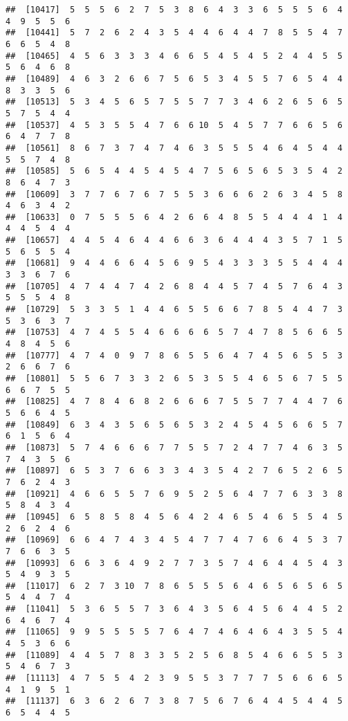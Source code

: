 \documentclass[
]{book}
\begin{document}
\begin{verbatim}
##  [10417]  5  5  5  6  2  7  5  3  8  6  4  3  3  6  5  5  5  6  4  4  9  5  5  6
##  [10441]  5  7  2  6  2  4  3  5  4  4  6  4  4  7  8  5  5  4  7  6  6  5  4  8
##  [10465]  4  5  6  3  3  3  4  6  6  5  4  5  4  5  2  4  4  5  5  5  6  4  6  8
##  [10489]  4  6  3  2  6  6  7  5  6  5  3  4  5  5  7  6  5  4  4  8  3  3  5  6
##  [10513]  5  3  4  5  6  5  7  5  5  7  7  3  4  6  2  6  5  6  5  5  7  5  4  4
##  [10537]  4  5  3  5  5  4  7  6  6 10  5  4  5  7  7  6  6  5  6  6  4  7  7  8
##  [10561]  8  6  7  3  7  4  7  4  6  3  5  5  5  4  6  4  5  4  4  5  5  7  4  8
##  [10585]  5  6  5  4  4  5  4  5  4  7  5  6  5  6  5  3  5  4  2  8  6  4  7  3
##  [10609]  3  7  7  6  7  6  7  5  5  3  6  6  6  2  6  3  4  5  8  4  6  3  4  2
##  [10633]  0  7  5  5  5  6  4  2  6  6  4  8  5  5  4  4  4  1  4  4  4  5  4  4
##  [10657]  4  4  5  4  6  4  4  6  6  3  6  4  4  4  3  5  7  1  5  5  6  5  5  4
##  [10681]  9  4  4  6  6  4  5  6  9  5  4  3  3  3  5  5  4  4  4  3  3  6  7  6
##  [10705]  4  7  4  4  7  4  2  6  8  4  4  5  7  4  5  7  6  4  3  5  5  5  4  8
##  [10729]  5  3  3  5  1  4  4  6  5  5  6  6  7  8  5  4  4  7  3  5  3  6  3  7
##  [10753]  4  7  4  5  5  4  6  6  6  6  5  7  4  7  8  5  6  6  5  4  8  4  5  6
##  [10777]  4  7  4  0  9  7  8  6  5  5  6  4  7  4  5  6  5  5  3  2  6  6  7  6
##  [10801]  5  5  6  7  3  3  2  6  5  3  5  5  4  6  5  6  7  5  5  6  6  7  5  5
##  [10825]  4  7  8  4  6  8  2  6  6  6  7  5  5  7  7  4  4  7  6  5  6  6  4  5
##  [10849]  6  3  4  3  5  6  5  6  5  3  2  4  5  4  5  6  6  5  7  6  1  5  6  4
##  [10873]  5  7  4  6  6  6  7  7  5  5  7  2  4  7  7  4  6  3  5  7  4  3  5  6
##  [10897]  6  5  3  7  6  6  3  3  4  3  5  4  2  7  6  5  2  6  5  7  6  2  4  3
##  [10921]  4  6  6  5  5  7  6  9  5  2  5  6  4  7  7  6  3  3  8  5  8  4  3  4
##  [10945]  6  5  8  5  8  4  5  6  4  2  4  6  5  4  6  5  5  4  5  2  6  2  4  6
##  [10969]  6  6  4  7  4  3  4  5  4  7  7  4  7  6  6  4  5  3  7  7  6  6  3  5
##  [10993]  6  6  3  6  4  9  2  7  7  3  5  7  4  6  4  4  5  4  3  5  4  9  3  5
##  [11017]  6  2  7  3 10  7  8  6  5  5  5  6  4  6  5  6  5  6  5  5  4  4  7  4
##  [11041]  5  3  6  5  5  7  3  6  4  3  5  6  4  5  6  4  4  5  2  6  4  6  7  4
##  [11065]  9  9  5  5  5  5  7  6  4  7  4  6  4  6  4  3  5  5  4  4  5  3  6  6
##  [11089]  4  4  5  7  8  3  3  5  2  5  6  8  5  4  6  6  5  5  3  5  4  6  7  3
##  [11113]  4  7  5  5  4  2  3  9  5  5  3  7  7  7  5  6  6  6  5  4  1  9  5  1
##  [11137]  6  3  6  2  6  7  3  8  7  5  6  7  6  4  4  5  4  4  5  6  5  4  4  5

\end{verbatim}
\end{document}
